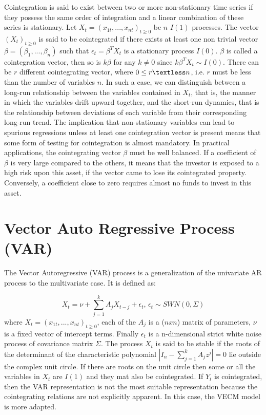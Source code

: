 \documentclass[11pt,a4,twosided,singlespacing,titlepagenumber=on]{scrreprt}
\numberwithin{equation}{chapter} %
\theoremstyle{remark}
\begin{document}
\noindent
Cointegration is said to exist between two or more non-stationary time series if they possess the same order of integration and a linear combination of these series is stationary. Let $X_t = (x_{1t},...,x_{nt})_{t \geq 0}$ be $n$ $I(1)$ processes. The vector $(X_t)_{t \geq 0}$ is said to be cointegrated if there exists at least one non trivial vector $\beta = (\beta_1,...,\beta_n)$ such that $\epsilon_t = \beta^T X_t$ is a stationary process $I(0)$. $\beta$ is called a cointegration vector, then so is $k \beta$ for any $k \neq 0$ since $k\beta^TX_t \sim I(0)$. There can be $r$ different cointegrating vector, where $0 \leq r \textless n$, i.e. $r$ must be less than the number of variables $n$. In such a case, we can distinguish between a long-run relationship between the variables contained in $X_t$, that is, the manner in which the variables drift upward together, and the short-run dynamics, that is the relationship between deviations of each variable from their corresponding long-run trend. The implication that non-stationary variables can lead to spurious regressions unless at least one cointegration vector is present means that some form of testing for cointegration is almost mandatory. In practical applications, the cointegrating vector $\beta$ must be well balanced. If a coefficient of $\beta$ is very large compared to the others, it means that the investor is exposed to a high risk upon this asset, if the vector came to lose its cointegrated property. Conversely, a coefficient close to zero requires almost no funds to invest in this asset.

\section{Vector Auto Regressive Process (VAR)}
The Vector Autoregressive (VAR) process is a generalization of the univariate AR process to the multivariate case. It is defined as:

$$X_t = \nu + \sum_{j=1}^k A_j X_{t-j} + \epsilon_t \text{, } \epsilon_t \sim SWN(0, \Sigma)$$
where $X_t = (x_{1t},...,x_{nt})_{t \geq 0}$, each of the $A_j$ is a ($nxn$) matrix of parameters, $\nu$ is a fixed vector of intercept terms. Finally $\epsilon_t$ is a n-dimensional strict white noise process of covariance matrix $\Sigma$. The process $X_t$ is said to be stable if the roots of the determinant of the characteristic polynomial $|I_n - \sum_{j=1}^k A_j z^j| = 0$ lie outside the complex unit circle. If there are roots on the unit circle then some or all the variables in $X_t$ are $I(1)$ and they mat also be cointegrated. If $Y_t$ is cointegrated, then the VAR representation is not the most suitable representation because the cointegrating relations are not explicitly apparent. In this case, the VECM model is more adapted.
\end{document}
